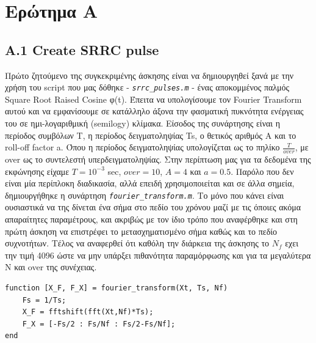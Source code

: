 \documentclass[11pt]{article}
\begin{document}
    \section*{Ερώτημα Α}
    
    \subsection*{A.1 Create SRRC pulse}
    Πρώτο ζητούμενο της συγκεκριμένης άσκησης είναι να δημιουργηθεί ξανά με την χρήση του script που μας δόθηκε - \emph{\texttt{srrc\_pulses.m}} - ένας αποκομμένος παλμός Square Root Raised Cosine φ(t). Έπειτα να υπολογίσουμε τον Fourier Transform αυτού και να εμφανίσουμε σε κατάλληλο άξονα την φασματική πυκνότητα ενέργειας του σε ημι-λογαριθμική (semilogy) κλίμακα. Είσοδος της συνάρτησης είναι η περίοδος συμβόλων T, η περίοδος δειγματοληψίας Ts, ο θετικός αριθμός Α και το roll-off factor a. Όπου η περίοδος δειγματοληψίας υπολογίζεται ως το πηλίκο $\frac{T}{over}$, με over ως το συντελεστή υπερδειγματοληψίας. Στην περίπτωση μας για τα δεδομένα της εκφώνησης είχαμε $T = {10^{−3}}$ sec, $over = 10$, $A = 4$ και $a = 0.5$. Παρόλο που δεν είναι μία περίπλοκη διαδικασία, αλλά επειδή χρησιμοποιείται και σε άλλα σημεία, δημιουργήθηκε η συνάρτηση \emph{\texttt{fourier\_transform.m}}. Το μόνο που κάνει είναι ουσιαστικά να της δίνεται ένα σήμα στο πεδίο του χρόνου μαζί με τις όποιες ακόμα απαραίτητες παραμέτρους, και ακριβώς με τον ίδιο τρόπο που αναφέρθηκε και στη πρώτη άσκηση να επιστρέφει το μετασχηματισμένο σήμα καθώς και το πεδίο συχνοτήτων. Τέλος να αναφερθεί ότι καθόλη την διάρκεια της άσκησης το $N_f$ εχει την τιμή 4096 ώστε να μην υπάρξει πιθανότητα παραμόρφωσης και για τα μεγαλύτερα N και over της συνέχειας. 
    
    \begin{lstlisting}[caption = {\emph{\texttt{fourier\_transform.m}}}]
function [X_F, F_X] = fourier_transform(Xt, Ts, Nf)
    Fs = 1/Ts;
    X_F = fftshift(fft(Xt,Nf)*Ts);
    F_X = [-Fs/2 : Fs/Nf : Fs/2-Fs/Nf];
end
    \end{lstlisting}
    
\end{document}
